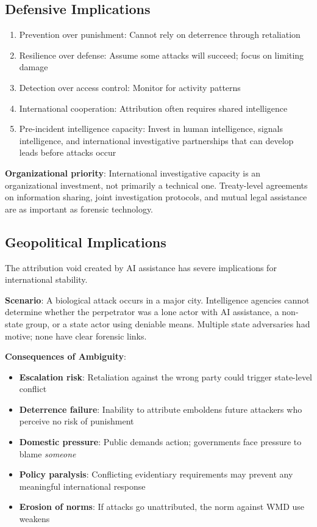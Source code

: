 \documentclass[11pt,letterpaper]{article}
\begin{document}
\subsection{Defensive Implications}

\begin{enumerate}
  \item Prevention over punishment: Cannot rely on deterrence through retaliation
  \item Resilience over defense: Assume some attacks will succeed; focus on limiting damage
  \item Detection over access control: Monitor for activity patterns
  \item International cooperation: Attribution often requires shared intelligence
  \item Pre-incident intelligence capacity: Invest in human intelligence, signals intelligence, and international investigative partnerships that can develop leads before attacks occur
\end{enumerate}

\textbf{Organizational priority}: International investigative capacity is an organizational investment, not primarily a technical one. Treaty-level agreements on information sharing, joint investigation protocols, and mutual legal assistance are as important as forensic technology.

\subsection{Geopolitical Implications}

The attribution void created by AI assistance has severe implications for international stability.

\begin{quotebox}
\textbf{Scenario}: A biological attack occurs in a major city. Intelligence agencies cannot determine whether the perpetrator was a lone actor with AI assistance, a non-state group, or a state actor using deniable means. Multiple state adversaries had motive; none have clear forensic links.
\end{quotebox}

\textbf{Consequences of Ambiguity}:
\begin{itemize}
  \item \textbf{Escalation risk}: Retaliation against the wrong party could trigger state-level conflict
  \item \textbf{Deterrence failure}: Inability to attribute emboldens future attackers who perceive no risk of punishment
  \item \textbf{Domestic pressure}: Public demands action; governments face pressure to blame \textit{someone}
  \item \textbf{Policy paralysis}: Conflicting evidentiary requirements may prevent any meaningful international response
  \item \textbf{Erosion of norms}: If attacks go unattributed, the norm against WMD use weakens
\end{itemize}
\end{document}
